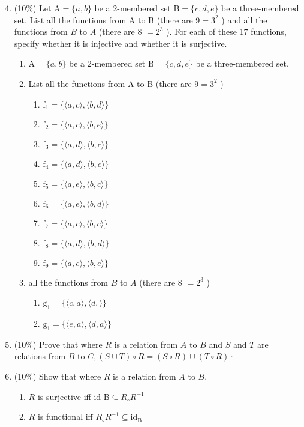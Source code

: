 \documentclass[10pt]{article}
\begin{document}
\begin{enumerate}
  \setcounter{enumi}{3}
  \item (10\%) Let $\mathrm{A}=\{a, b\}$ be a 2-membered set $\mathrm{B}=\{c, d, e\}$ be a three-membered set. List all the functions from A to B (there are $9=3^{2}$ ) and all the functions from $B$ to $A$ (there are 8 $=2^{3}$ ). For each of these 17 functions, specify whether it is injective and whether it is surjective.
  \begin{enumerate}
    \item $\mathrm{A}=\{a, b\}$ be a 2-membered set $\mathrm{B}=\{c, d, e\}$ be a three-membered set.
    \item List all the functions from A to B (there are $9=3^{2}$ )
    \begin{enumerate}
      \item $\mathrm{f}_{1}=\{\langle a, c\rangle, \langle b, d\rangle\}$
      \item $\mathrm{f}_{2}=\{\langle a, c\rangle, \langle b, e\rangle\}$
      \item $\mathrm{f}_{3}=\{\langle a, d\rangle, \langle b, c\rangle\}$
      \item $\mathrm{f}_{4}=\{\langle a, d\rangle, \langle b, e\rangle\}$
      \item $\mathrm{f}_{5}=\{\langle a, e\rangle, \langle b, c\rangle\}$
      \item $\mathrm{f}_{6}=\{\langle a, e\rangle, \langle b, d\rangle\}$
      \item $\mathrm{f}_{7}=\{\langle a, c\rangle, \langle b, c\rangle\}$
      \item $\mathrm{f}_{8}=\{\langle a, d\rangle, \langle b, d\rangle\}$
      \item $\mathrm{f}_{9}=\{\langle a, e\rangle, \langle b, e\rangle\}$
    \end{enumerate}
    \item all the functions from $B$ to $A$ (there are 8 $=2^{3}$ )
    \begin{enumerate}
      \item $\mathrm{g}_{1}=\{\langle c, a\rangle, \langle d, \rangle\}$
      \item $\mathrm{g}_{1}=\{\langle e, a\rangle, \langle d, a\rangle\}$
    \end{enumerate}
  \end{enumerate}
  \item (10\%) Prove that where $R$ is a relation from $A$ to $B$ and $S$ and $T$ are relations from $B$ to $C,(S \cup T) \circ R=(S \circ R) \cup(T \circ R) \cdot$

  \item (10\%) Show that where $R$ is a relation from $A$ to $B$,
  \begin{enumerate}
    \item $R$ is surjective iff id $\mathrm{B} \subseteq R_{\circ} R^{-1}$

    \item $R$ is functional iff $R_{\circ} R^{-1} \subseteq \mathrm{id}_{\mathrm{B}}$
  \end{enumerate}
\end{enumerate}
\end{document}
